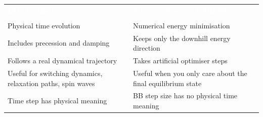 \documentclass[12pt]{standalone}
\begin{document}
\renewcommand{\arraystretch}{1.55}
\setlength{\tabcolsep}{10pt}

\begin{tabular}{
  >{\raggedright\arraybackslash}p{7.5cm}
  >{\raggedright\arraybackslash}p{7.5cm}
}

\rowcolor{headerblue}
\textcolor{white}{\textbf{LLG method}} &
\textcolor{white}{\textbf{Steepest descent + BB step}} \\[4pt]

\rowcolor{rowgray}
\multicolumn{1}{c}{%
  $\dfrac{\partial \mathbf{m}}{\partial t}
    = -\gamma\,\mathbf{m}\times\mathbf{H}_{\mathrm{eff}}
      + \alpha\,\mathbf{m}\times\dfrac{\partial \mathbf{m}}{\partial t}$
} &
\multicolumn{1}{c}{%
  $\mathbf{m}_{n+1}
    = \operatorname{normalize}\!\left(
        \mathbf{m}_n - \tau_n^{\mathrm{BB}}\,\nabla_{\!S} E(\mathbf{m}_n)
      \right)$
} \\

Physical time evolution &
Numerical energy minimisation \\

\rowcolor{rowgray}
Includes precession and damping &
Keeps only the downhill energy direction \\

Follows a real dynamical trajectory &
Takes artificial optimiser steps \\

\rowcolor{rowgray}
Useful for switching dynamics, relaxation paths, spin waves &
Useful when you only care about the final equilibrium state \\

Time step has physical meaning &
BB step size has no physical time meaning \\

\bottomrule
\end{tabular}
\end{document}
